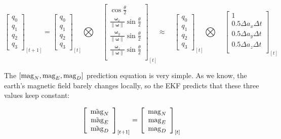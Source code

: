 \begin{equation}
        \left[\begin{array}{c}
            q_0  \\
            q_1  \\
            q_2  \\
            q_3
        \end{array}\right]_{[t+1]}=\left[\begin{array}{c}
            q_0  \\
            q_1  \\
            q_2  \\
            q_3
        \end{array}\right]_{[t]} \bigotimes\quad \left[\begin{array}{c}
            \cos{\frac{\theta}{2}}  \\
            \frac{\boldsymbol{\omega}_x}{\left\lVert\boldsymbol{\omega}\right\rVert} \sin \frac{\theta}{2}  \\
            \frac{\boldsymbol{\omega}_y}{\left\lVert\boldsymbol{\omega}\right\rVert} \sin \frac{\theta}{2}  \\
            \frac{\boldsymbol{\omega}_z}{\left\lVert\boldsymbol{\omega}\right\rVert} \sin \frac{\theta}{2}  \\
        \end{array}\right]_{[t]}\approx\quad \left[\begin{array}{c}
            q_0  \\
            q_1  \\
            q_2  \\
            q_3
        \end{array}\right]_{[t]}\bigotimes\quad \left[\begin{array}{c}
            1  \\
            0.5\Delta a_x\Delta t  \\
            0.5\Delta a_y\Delta t  \\
            0.5\Delta a_z\Delta t  \\
        \end{array}\right]_{[t]}
\end{equation}

The $[{\rm mag}_N, {\rm mag}_E, {\rm mag}_D]$ prediction equation is very simple. As we know, the earth's magnetic field barely changes locally, so the EKF predicts that these three values keep constant:

\begin{equation}
    \left[\begin{array}{c}
            \Tilde{\rm mag}_N  \\
            \Tilde{\rm mag}_E  \\
            \Tilde{\rm mag}_D
        \end{array}\right]_{[t+1]}=\left[\begin{array}{c}
            {\rm mag}_N  \\
            {\rm mag}_E  \\
            {\rm mag}_D
        \end{array}\right]_{[t]}
\end{equation}



